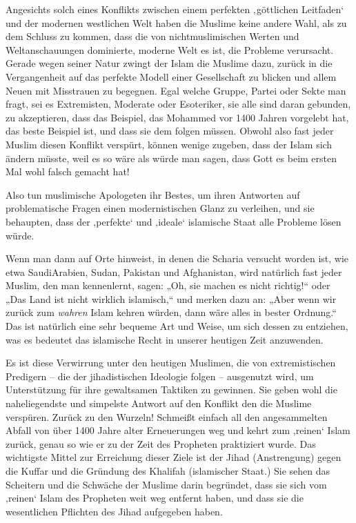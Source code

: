 \documentclass[12pt]{memoir}
\begin{document}
Angesichts solch eines Konflikts zwischen einem perfekten
‚göttlichen Leitfaden‘ und der modernen westlichen Welt
haben die Muslime keine andere Wahl, als zu dem Schluss zu kommen,
dass die von nicht\–muslimischen Werten
und Weltanschauungen dominierte, moderne Welt es ist,
die Probleme verursacht.
Gerade wegen seiner Natur zwingt der Islam die Muslime dazu,
zurück in die Vergangenheit auf das perfekte Modell einer Gesellschaft
zu blicken und allem Neuen mit Misstrauen zu begegnen.
Egal welche Gruppe, Partei oder Sekte man fragt,
sei es Extremisten, Moderate oder Esoteriker,
sie alle sind daran gebunden, zu akzeptieren,
dass das Beispiel, das Mohammed vor 1400 Jahren vorgelebt hat,
das beste Beispiel ist, und dass sie dem folgen müssen.
Obwohl also fast jeder Muslim diesen Konflikt verspürt,
können wenige zugeben, dass der Islam sich ändern müsste,
weil es so wäre als würde man sagen,
dass Gott es beim ersten Mal wohl falsch gemacht hat!

Also tun muslimische Apologeten ihr Bestes,
um ihren Antworten auf problematische Fragen
einen modernistischen Glanz zu verleihen, und sie behaupten,
dass der ‚perfekte‘ und ‚ideale‘ islamische Staat alle Probleme lösen würde.

Wenn man dann auf Orte hinweist, in denen die Scharia versucht worden ist,
wie etwa Saudi\–Arabien, Sudan, Pakistan und Afghanistan,
wird natürlich fast jeder Muslim, den man kennenlernt, sagen:
„Oh, sie machen es nicht richtig!“ oder
„Das Land ist nicht wirklich islamisch,“ und merken dazu an:
„Aber wenn wir zurück zum \emph{wahren} Islam kehren würden,
dann wäre alles in bester Ordnung.“
Das ist natürlich eine sehr bequeme Art und Weise,
um sich dessen zu entziehen, was es bedeutet
das islamische Recht in unserer heutigen Zeit anzuwenden.

Es ist diese Verwirrung unter den heutigen Muslimen,
die von extremistischen Predigern –
die der jihadistischen Ideologie folgen – ausgenutzt wird,
um Unterstützung für ihre gewaltsamen Taktiken zu gewinnen.
Sie geben wohl die naheliegendste und simpelste Antwort
auf den Konflikt den die Muslime verspüren.
Zurück zu den Wurzeln!
Schmeißt einfach all den angesammelten Abfall
von über 1400 Jahre alter Erneuerungen weg
und kehrt zum ‚reinen‘ Islam zurück,
genau so wie er zu der Zeit des Propheten praktiziert wurde.
Das wichtigste Mittel zur Erreichung dieser Ziele ist der Jihad (Anstrengung)
gegen die Kuffar und die Gründung des Khalifah (islamischer Staat.)
Sie sehen das Scheitern und die Schwäche der Muslime darin begründet,
dass sie sich vom ‚reinen‘ Islam des Propheten weit weg entfernt haben,
und dass sie die wesentlichen Pflichten des Jihad aufgegeben haben.
\end{document}
